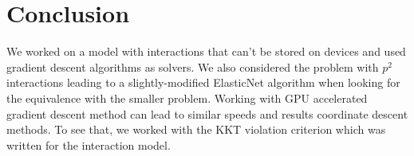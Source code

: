 \documentclass[a4]{article}
\begin{document}
\section*{Conclusion}

We worked on a model with interactions that can't be stored on devices and used gradient descent algorithms as solvers.
We also considered the problem with $p^2$ interactions leading to a slightly-modified ElasticNet algorithm when looking for
the equivalence with the smaller problem. Working with GPU accelerated gradient descent method can lead to similar speeds and results
coordinate descent methods. To see that, we worked with the KKT violation criterion which was written for the interaction model.

\newpage

\end{document}
